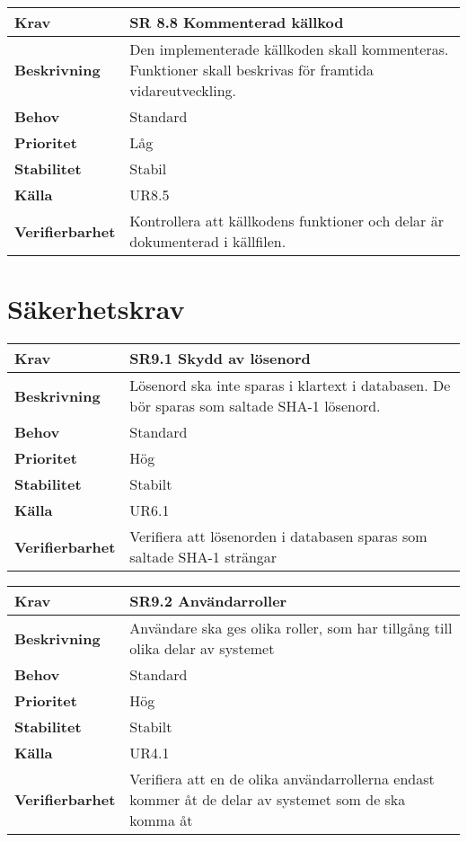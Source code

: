 \documentclass[a4paper, twoside, 11pt, titlepage]{article}
\begin{document}
	\begin{tabular} { p{2.6cm} p{12.5cm} }
		\hline
		\sffamily\textbf{Krav} & \sffamily\textbf{SR 8.8 Kommenterad källkod } \\
		\hline
		\sffamily\textbf{Beskrivning} & Den implementerade källkoden skall kommenteras. Funktioner skall beskrivas för framtida vidareutveckling.  \\
		\hline
		\sffamily\textbf{Behov} & Standard  \\
		\hline
		\sffamily\textbf{Prioritet} & Låg  \\
		\hline
		\sffamily\textbf{Stabilitet} & Stabil  \\
		\hline
		\sffamily\textbf{Källa} & UR8.5  \\
		\hline
		\sffamily\textbf{Verifierbarhet} & Kontrollera att källkodens funktioner och delar är dokumenterad i källfilen.  \\
		\hline
	\end{tabular}


\clearpage
\section{Säkerhetskrav}


\begin{tabular} { p{2.6cm} p{12.5cm} }
	\hline
	\sffamily\textbf{Krav} & \sffamily\textbf{SR9.1 Skydd av lösenord } \\
	\hline
	\sffamily\textbf{Beskrivning} & Lösenord ska inte sparas i klartext i databasen. De bör sparas som saltade SHA-1 lösenord.  \\
	\hline
	\sffamily\textbf{Behov} & Standard  \\
	\hline
	\sffamily\textbf{Prioritet} & Hög  \\
	\hline
	\sffamily\textbf{Stabilitet} & Stabilt  \\
	\hline
	\sffamily\textbf{Källa} & UR6.1  \\
	\hline
	\sffamily\textbf{Verifierbarhet} & Verifiera att lösenorden i databasen sparas som saltade SHA-1 strängar  \\
	\hline
\end{tabular}
\vspace{6mm}

\begin{tabular} { p{2.6cm} p{12.5cm} }
	\hline
	\sffamily\textbf{Krav} & \sffamily\textbf{SR9.2 Användarroller } \\
	\hline
	\sffamily\textbf{Beskrivning} & Användare ska ges olika roller, som har tillgång till olika delar av systemet  \\
	\hline
	\sffamily\textbf{Behov} & Standard  \\
	\hline
	\sffamily\textbf{Prioritet} & Hög  \\
	\hline
	\sffamily\textbf{Stabilitet} & Stabilt  \\
	\hline
	\sffamily\textbf{Källa} & UR4.1  \\
	\hline
	\sffamily\textbf{Verifierbarhet} & Verifiera att en de olika användarrollerna endast kommer åt de delar av systemet som de ska komma åt  \\
	\hline
\end{tabular}
\vspace{6mm}
\end{document}

